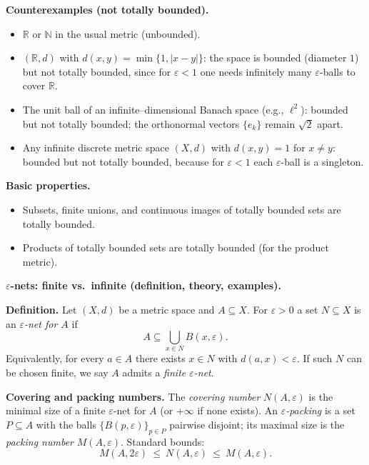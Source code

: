 \documentclass[12pt,a4paper]{article}
\begin{document}
	\medskip
	\textbf{Counterexamples (not totally bounded).}
	\begin{itemize}
		\item $\mathbb{R}$ or $\mathbb{N}$ in the usual metric (unbounded).
		\item $(\mathbb{R},d)$ with $d(x,y)=\min\{1,|x-y|\}$:
		the space is bounded (diameter $1$) but not totally bounded, since for $\varepsilon<1$
		one needs infinitely many $\varepsilon$-balls to cover $\mathbb{R}$.
		\item The unit ball of an infinite--dimensional Banach space (e.g., $\ell^2$):
		bounded but not totally bounded; the orthonormal vectors $\{e_k\}$ remain $\sqrt2$ apart.
		\item Any infinite discrete metric space $(X,d)$ with $d(x,y)=1$ for $x\neq y$:
		bounded but not totally bounded, because for $\varepsilon<1$
		each $\varepsilon$-ball is a singleton.
	\end{itemize}
	
	\medskip
	\textbf{Basic properties.}
	\begin{itemize}
		\item Subsets, finite unions, and continuous images of totally bounded sets are totally bounded.
		\item Products of totally bounded sets are totally bounded (for the product metric).
	\end{itemize}
	
	{\Large\bfseries $\varepsilon$-nets: finite vs.\ infinite (definition, theory, examples).\par}
	
	\medskip
	\textbf{Definition.}
	Let $(X,d)$ be a metric space and $A\subseteq X$. For $\varepsilon>0$ a set $N\subseteq X$ is an \emph{$\varepsilon$-net for $A$} if
	\[
	A \subseteq \bigcup_{x\in N} B(x,\varepsilon).
	\]
	Equivalently, for every $a\in A$ there exists $x\in N$ with $d(a,x)<\varepsilon$.
	If such $N$ can be chosen finite, we say $A$ admits a \emph{finite $\varepsilon$-net}.
	
	\medskip
	\textbf{Covering and packing numbers.}
	The \emph{covering number} $N(A,\varepsilon)$ is the minimal size of a finite $\varepsilon$-net for $A$ (or $+\infty$ if none exists).
	An \emph{$\varepsilon$-packing} is a set $P\subseteq A$ with the balls $\{B(p,\varepsilon)\}_{p\in P}$ pairwise disjoint;
	its maximal size is the \emph{packing number} $M(A,\varepsilon)$.
	Standard bounds:
	\[
	M(A,2\varepsilon)\ \le\ N(A,\varepsilon)\ \le\ M(A,\varepsilon).
	\]
	
\end{document}
